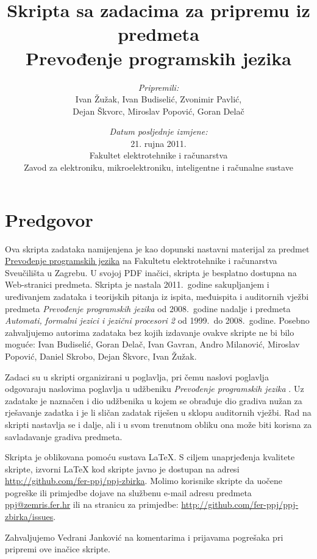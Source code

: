 \documentclass[times, 12pt, utf8]{book}
\title{
\vfill
Skripta sa zadacima za pripremu iz predmeta \\
Prevođenje programskih jezika \\
\vspace{70pt}
}
\author{
\emph{Pripremili:} \\
Ivan Žužak, Ivan Budiselić, Zvonimir Pavlić, \\
Dejan Škvorc, Miroslav Popović, Goran Delač \\}
\date{
\vspace{30pt} 
\emph{Datum posljednje izmjene:} \\
21. rujna 2011.\\
\vfill
Fakultet elektrotehnike i računarstva \\
Zavod za elektroniku, mikroelektroniku, inteligentne i računalne sustave
}
\begin{document}
\maketitle

\let\cleardoublepage\clearpage

\tableofcontents


\chapter*{Predgovor}

\begin{spacing}{1.5}
Ova skripta zadataka namijenjena je kao dopunski nastavni materijal za predmet \href{http://www.fer.unizg.hr/predmet/ppj_a}{Prevođenje programskih jezika} na Fakultetu elektrotehnike i računarstva Sveučilišta u Zagrebu. 
U svojoj PDF inačici, skripta je besplatno dostupna na Web-stranici predmeta.
Skripta je nastala 2011.~godine sakupljanjem i uređivanjem zadataka i teorijskih pitanja iz ispita, međuispita i auditornih vježbi predmeta \emph{Prevođenje programskih jezika} od 2008.~godine nadalje i predmeta \emph{Automati, formalni jezici i jezični procesori 2} od 1999.~do 2008.~godine.
Posebno zahvaljujemo autorima zadataka bez kojih izdavanje ovakve skripte ne bi bilo moguće:
Ivan Budiselić,
Goran Delač,
Ivan Gavran,
Andro Milanović,
Miroslav Popović,
Daniel Skrobo,
Dejan Škvorc,
Ivan Žužak.

Zadaci su u skripti organizirani u poglavlja, pri čemu naslovi poglavlja odgovaraju naslovima poglavlja u udžbeniku \emph{Prevođenje programskih jezika} \cite{udzbenik}.
Uz zadatake je naznačen i dio udžbenika u kojem se obrađuje dio gradiva nužan za rješavanje zadatka i je li sličan zadatak riješen u sklopu auditornih vježbi.
Rad na skripti nastavlja se i dalje, ali i u svom trenutnom obliku ona može biti korisna za savladavanje gradiva predmeta.

Skripta je oblikovana pomoću sustava \LaTeX{}.
S ciljem unaprjeđenja kvalitete skripte, izvorni \LaTeX{} kod skripte javno je dostupan na adresi \url{http://github.com/fer-ppj/ppj-zbirka}.
Molimo korisnike skripte da uočene pogreške ili primjedbe dojave na službenu e-mail adresu predmeta \href{mailto:ppj@zemris.fer.hr}{ppj@zemris.fer.hr} ili na stranicu za primjedbe: \url{http://github.com/fer-ppj/ppj-zbirka/issues}. 

Zahvaljujemo Vedrani Janković na komentarima i prijavama pogrešaka pri pripremi ove inačice skripte.
\end{spacing}
\end{document}
